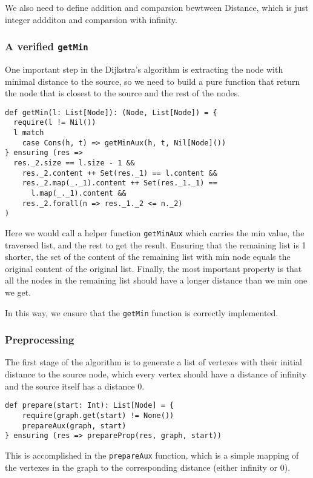 \documentclass[11pt,a4paper]{article}
\begin{document}
We also need to define addition and comparsion bewtween Distance, 
which is just integer addditon and comparsion with infinity.

\subsubsection{A verified \texttt{getMin}}

One important step in the Dijkstra's algorithm is extracting the node with
minimal distance to the source, so we need to build a pure function that
return the node that is closest to the source and the rest of the nodes.

\begin{lstlisting}
def getMin(l: List[Node]): (Node, List[Node]) = {
  require(l != Nil())
  l match
    case Cons(h, t) => getMinAux(h, t, Nil[Node]())
} ensuring (res =>
  res._2.size == l.size - 1 &&
    res._2.content ++ Set(res._1) == l.content &&
    res._2.map(_._1).content ++ Set(res._1._1) == 
      l.map(_._1).content &&
    res._2.forall(n => res._1._2 <= n._2)
)
\end{lstlisting}

Here we would call a helper function \texttt{getMinAux} which carries the min value,
the traversed list, and the rest to get the result. Ensuring that the remaining list
is 1 shorter, the set of the content of the remaining list with min node equals the original
content of the original list. Finally, the most important property is that all the nodes
in the remaining list should have a longer distance than we min one we get.

In this way, we ensure that the \texttt{getMin} function is correctly implemented.

\subsubsection{Preprocessing}

The first stage of the algorithm is to generate a list of vertexes with their initial 
distance to the source node, which every vertex should have a distance of infinity 
and the source itself has a distance 0.

\begin{lstlisting}
def prepare(start: Int): List[Node] = {
    require(graph.get(start) != None())
    prepareAux(graph, start)
} ensuring (res => prepareProp(res, graph, start))
\end{lstlisting}

This is accomplished in the \texttt{prepareAux} function, which is a simple mapping of
the vertexes in the graph to the corresponding distance (either infinity or 0).
\end{document}
